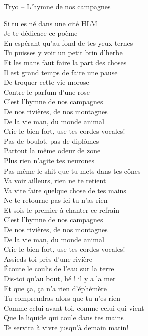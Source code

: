 \documentclass{novel}
\begin{document}
\newpage
\small
\h*{Tryo – L’hymne de nos campagnes}
\begin{multicols}{2}
Si tu es né dans une cité HLM \\
Je te dédicace ce poème \\
En espérant qu'au fond de tes yeux ternes \\
Tu puisses y voir un petit brin d'herbe \\
Et les mans faut faire la part des choses \\
Il est grand temps de faire une pause \\
De troquer cette vie morose \\
Contre le parfum d'une rose \\

C'est l'hymne de nos campagnes \\
De nos rivières, de nos montagnes \\
De la vie man, du monde animal \\
Crie-le bien fort, use tes cordes vocales! \\

Pas de boulot, pas de diplômes \\
Partout la même odeur de zone \\
Plus rien n'agite tes neurones \\
Pas même le shit que tu mets dans tes cônes \\
Va voir ailleurs, rien ne te retient \\
Va vite faire quelque chose de tes mains \\
Ne te retourne pas ici tu n'as rien \\
Et sois le premier à chanter ce refrain \\

C'est l'hymne de nos campagnes \\
De nos rivières, de nos montagnes \\
De la vie man, du monde animal \\
Crie-le bien fort, use tes cordes vocales! \\

Assieds-toi près d'une rivière \\
Écoute le coulis de l'eau sur la terre \\
Dis-toi qu'au bout, hé ! il y a la mer \\
Et que ça, ça n'a rien d'éphémère \\
Tu comprendras alors que tu n'es rien \\
Comme celui avant toi, comme celui qui vient \\
Que le liquide qui coule dans tes mains \\
Te servira à vivre jusqu'à demain matin! \\


\end{multicols}
\end{document}
